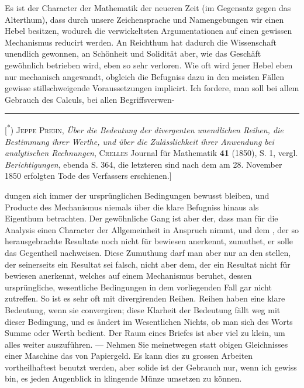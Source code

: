 \indent Es ist der Character der Mathematik der neueren Zeit (im Gegensatz gegen das Alterthum), dass durch unsere Zeichensprache und Namengebungen wir einen Hebel besitzen, wodurch die verwickeltsten Argumentationen auf einen gewissen Mechanismus reducirt werden. An Reichthum hat dadurch die Wissenschaft unendlich gewonnen, an Schönheit und Solidität aber, wie das Geschäft gewöhnlich betrieben wird, eben so sehr verloren. Wie oft wird jener Hebel eben nur mechanisch angewandt, obgleich die Befugniss dazu in den meisten Fällen gewisse stillschweigende Voraussetzungen implicirt. Ich fordere, man soll bei allem Gebrauch des Calculs, bei allen Begriffsverwen-
\par\medskip\noindent\rule{.24\linewidth}{.4pt}\par\smallskip
{\small\noindent\hspace*{\parindent}[\textsuperscript{*}) \textsc{Jeppe Prehn}, \textit{Über die Bedeutung der divergenten unendlichen Reihen, die Bestimmung ihrer Werthe, und über die Zulässlichkeit ihrer Anwendung bei analytischen Rechnungen}, \textsc{Crelles} Journal für Mathematik \textbf{41} (1850), S. 1, vergl. \textit{Berichtigungen}, ebenda S. 364, die letzteren sind nach dem am 28. November 1850 erfolgten Tode des Verfassers erschienen.]\par}
\clearpage{}
\noindent dungen sich immer der ursprünglichen Bedingungen bewusst bleiben, und  Producte des Mechanismus niemals über die klare Befugniss hinaus als Eigenthum betrachten. Der gewöhnliche Gang ist aber der, dass man für die Analysis einen Character der Allgemeinheit in Anspruch nimmt, und dem , der so herausgebrachte Resultate noch nicht für bewiesen anerkennt, zumuthet, er solle das Gegentheil nachweisen. Diese Zumuthung darf man aber nur an den stellen, der seinerseits  ein Resultat sei falsch, nicht aber dem, der ein Resultat nicht für bewiesen anerkennt, welches auf einem Mechanismus beruhet, dessen ursprüngliche, wesentliche Bedingungen in dem vorliegenden Fall gar nicht zutreffen. So ist es sehr oft mit divergirenden Reihen. Reihen haben eine klare Bedeutung, wenn sie convergiren; diese Klarheit der Bedeutung fällt weg mit dieser Bedingung, und es ändert im Wesentlichen Nichts, ob man sich des Worts Summe oder Werth bedient. Der Raum eines Briefes ist aber viel zu klein, um alles weiter auszuführen. — Nehmen Sie meinetwegen statt obigen Gleichnisses einer Maschine das von Papiergeld. Es kann dies zu grossen Arbeiten vortheilhaftest benutzt werden, aber solide ist der Gebrauch nur, wenn ich gewiss bin, es jeden Augenblick in klingende Münze umsetzen zu können.

